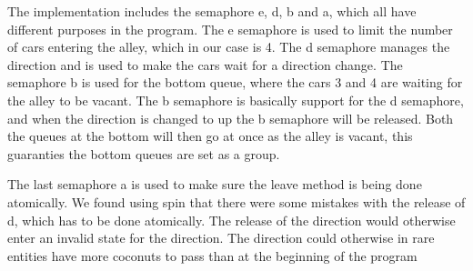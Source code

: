 The implementation includes the semaphore e, d, b and a, which all have different purposes in the program. The e semaphore is used to limit the number of cars entering the alley, which in our case is 4. The d semaphore manages the direction and is used to make the cars wait for a direction change. The semaphore b is used for the bottom queue, where the cars 3 and 4 are waiting for the alley to be vacant. The b semaphore is basically support for the d semaphore, and when the direction is changed to up the b semaphore will be released. Both the queues at the bottom will then go at once as the alley is vacant, this guaranties the bottom queues are set as a group.

The last semaphore a is used to make sure the leave method is being done atomically. We found using spin that there were some mistakes with the release of d, which has to be done atomically. The release of the direction would otherwise enter an invalid state for the direction. The direction could otherwise in rare entities have more coconuts to pass than at the beginning of the program